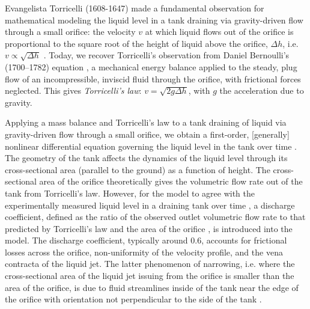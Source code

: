 \documentclass[openacc]{rsproca_new}%
\begin{document}

Evangelista Torricelli (1608-1647) made a fundamental observation for mathematical modeling the liquid level in a tank draining via gravity-driven flow through a small orifice: the velocity $v$ at which liquid flows out of the orifice is proportional to the square root of the height of liquid above the orifice, $\Delta h$, i.e. $v\propto \sqrt{\Delta h}$ \cite{mills1982newton}.
Today, we recover Torricelli's observation from Daniel Bernoulli's (1700–1782) equation \cite{welty2020fundamentals}, a mechanical energy balance applied to the steady, plug flow of an incompressible, inviscid fluid through the orifice, with frictional forces neglected. This gives \emph{Torricelli's law}: $v=\sqrt{2 g \Delta h}$, with $g$ the acceleration due to gravity. \cite{d2021torricelli,teoman2022discharge}

Applying a mass balance and Torricelli's law to a tank draining of liquid via gravity-driven flow through a small orifice, we obtain a first-order, [generally] nonlinear differential equation governing the liquid level in the tank over time \cite{groetsch1993inverse,seborg2016process,debook}.
The geometry of the tank affects the dynamics of the liquid level through its cross-sectional area (parallel to the ground) as a function of height.
The cross-sectional area of the orifice theoretically gives the volumetric flow rate out of the tank from Torricelli's law. 
However, for the model to agree with the experimentally measured liquid level in a draining tank over time \cite{de2000pin,blasone2015discharge,wadhwa2021study,liu2008drainage}, a discharge coefficient, defined as the ratio of the observed outlet volumetric flow rate to that predicted by Torricelli's law and the area of the orifice \cite{hicks2014determining}, is introduced into the model. 
The discharge coefficient, typically around 0.6,
accounts for frictional losses across the orifice, non-uniformity of the velocity profile, and the vena contracta of the liquid jet.
The latter phenomenon of narrowing, i.e. where the cross-sectional area of the liquid jet issuing from the orifice is smaller than the area of the orifice, is due to fluid streamlines inside of the tank near the edge of the orifice with orientation not perpendicular to the side of the tank \cite{horsch2020simple}. 
\cite{teoman2022discharge,hicks2014determining,blasone2015discharge,lienhard1984velocity,wadhwa2021study}
\end{document}
